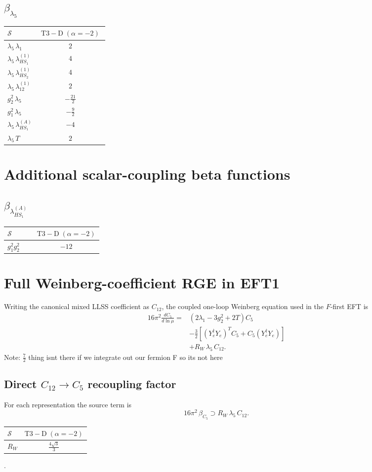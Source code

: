 \documentclass[9pt]{article}
\begin{document}
\subsection*{$ \beta_{\lambda_5} $}
\begin{longtable}{@{}p{0.31\linewidth}c@{}}
\toprule
$\mathcal{S}$ & $ \mathrm{T3-D}\;(\alpha=-2) $ \\
\midrule
$ \lambda_5\,\lambda_1 $ & $ 2 $ \\
$ \lambda_5\,\lambda_{HS_1}^{(1)} $ & $ 4 $ \\
$ \lambda_5\,\lambda_{HS_2}^{(1)} $ & $ 4 $ \\
$ \lambda_5\,\lambda_{12}^{(1)} $ & $ 2 $ \\
$ g_2^2\,\lambda_5 $ & $ - \frac{21}{2} $ \\
$ g_1^2\,\lambda_5 $ & $ - \frac{9}{2} $ \\
$ \lambda_5\,\lambda_{HS_1}^{(A)} $ & $ -4 $ \\
$ \lambda_5\,T $ & $ 2 $ \\
\bottomrule
\end{longtable}
\section*{Additional scalar-coupling beta functions}
\subsection*{$ \beta_{\lambda_{HS_1}^{(A)}} $}
\begin{longtable}{@{}p{0.31\linewidth}c@{}}
\toprule
$\mathcal{S}$ & $ \mathrm{T3-D}\;(\alpha=-2) $ \\
\midrule
$ g_1^2g_2^2 $ & $ -12 $ \\
\bottomrule
\end{longtable}

\section*{Full Weinberg-coefficient RGE in EFT1}
Writing the canonical mixed LLSS coefficient as $C_{12}$, the coupled one-loop Weinberg equation used in the $F$-first EFT is
\begin{align}
16\pi^2\frac{dC_5}{d\ln\mu}={}&(2\lambda_1-3g_2^2+2T)C_5\\
&-\frac32\left[(Y_e^\dagger Y_e)^T C_5+C_5(Y_e^\dagger Y_e)\right]\\
&+R_W\,\lambda_5\,C_{12}.
\end{align}
Note: $\frac{7}{2}$ thing isnt there if we integrate out our fermion F so its not here \subsection*{Direct $C_{12}\to C_5$ recoupling factor}
For each representation the source term is
\[16\pi^2\,\beta_{C_5}\supset R_W\,\lambda_5\,C_{12}.\]
\begin{longtable}{@{}lc@{}}
\toprule
$\mathcal{S}$ & $ \mathrm{T3-D}\;(\alpha=-2) $ \\
\midrule
$R_W$ & $ \frac{4 \sqrt{3}}{3} $ \\
\bottomrule
\end{longtable}
.
\end{document}
